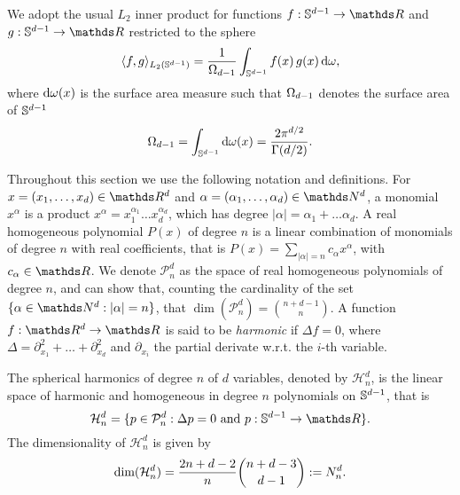We adopt the usual $L_2$ inner product for functions $f: \dsphere \rightarrow \Reals$ and $g: \dsphere \rightarrow \Reals$ restricted to the sphere 
\begin{equation}
     \langle f, g\rangle_{L_{2}(\mathbb{S}^{d-1})} = \frac{1}{\Omega_{d-1}} \int_{\mathbb{S}^{d-1}} f(x)\,g(x) \, \mathrm{d}{\omega},
\end{equation}
where $\mathrm{d}{\omega(x)}$ is the surface area measure such that $\Omega_{d-1}$ denotes the surface area of $\mathbb{S}^{d-1}$ 
\begin{equation}
\label{eq:surface}
    \Omega_{d-1} = \int_{\mathbb{S}^{d-1}} \mathrm{d}{\omega(x)} = \frac{2 \pi ^ {d/2}}{\Gamma(d/2)}.
\end{equation}

Throughout this section we use the following notation and definitions. For $x = (x_1, \ldots, x_d) \in \Reals^d$ and $\alpha = (\alpha_1, \ldots, \alpha_d) \in \Naturals^d$, a monomial $x^\alpha$ is a product $x^\alpha = x_1^{\alpha_1} \ldots x_d^{\alpha_d}$, which has degree $|\alpha| = \alpha_1 + \ldots \alpha_d$. A real homogeneous polynomial $P(x)$ of degree $n$ is a linear combination of monomials of degree $n$ with real coefficients, that is $P(x) = \sum_{|\alpha| = n} c_{\alpha} x^{\alpha}$, with $c_\alpha \in \Reals$. We denote $\mathcal{P}_n^d$ as the space of real homogeneous polynomials of degree $n$, and can show that, counting the cardinality of the set $\{\alpha \in \Naturals^d: |\alpha| = n\}$, that $\dim(\mathcal{P}_n^d) = \binom{n + d -1}{n}$. A function $f:\Reals^d \rightarrow \Reals$ is said to be \emph{harmonic} if $\Delta f = 0$, where $\Delta = \partial_{x_1}^2 + \ldots + \partial_{x_d}^2$ and $\partial_{x_i}$ the partial derivate w.r.t. the $i$-th variable.

\begin{definition}
    The spherical harmonics of degree $n$ of $d$ variables, denoted by $\mathcal{H}_{n}^d$, is the linear space of harmonic and homogeneous in degree $n$ polynomials on $\mathbb{S}^{d-1}$, that is 
    \begin{equation}
        \mathcal{H}_{n}^d = \{p \in \mathcal{P}_n^d: \Delta p = 0\ \text{and}\ p: \dsphere \rightarrow \Reals \}.
    \end{equation}
The dimensionality of $ \mathcal{H}_{n}^d$ is given by
\begin{equation}
\label{eq:numharmonics}
\textrm{dim}(\mathcal{H}_{n}^d) = \frac{2 n + d - 2}{n} \binom{n + d - 3}{d - 1} := N^d_n.
\end{equation}
\end{definition}

